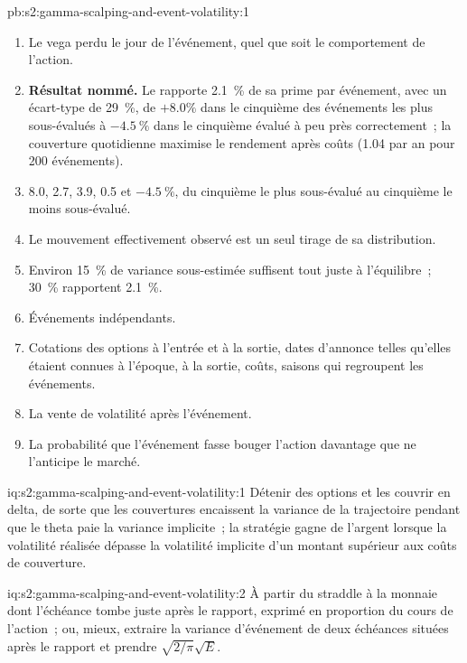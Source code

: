 \begin{solution}{pb:s2:gamma-scalping-and-event-volatility:1}
\begin{enumerate}
\item Le vega perdu le jour de l'événement, quel que soit le comportement de l'action.
\item \textbf{Résultat nommé.} Le  rapporte 2.1~\% de sa prime par événement, avec un écart-type de 29~\%, de $+8.0\%$ dans le cinquième des
événements les plus sous-évalués à $-4.5~\%$ dans le cinquième évalué à peu près correctement~; la couverture quotidienne maximise le rendement après coûts (1.04 par an pour 200 événements).
\item 8.0, 2.7, 3.9, 0.5 et $-4.5~\%$, du cinquième le plus sous-évalué au cinquième le moins sous-évalué.
\item Le mouvement effectivement observé est un seul tirage de sa distribution.
\item Environ 15~\% de variance sous-estimée suffisent tout juste à l'équilibre~; 30~\% rapportent 2.1~\%.
\item Événements indépendants.
\item Cotations des options à l'entrée et à la sortie, dates d'annonce telles qu'elles étaient connues à l'époque,  à la sortie, coûts, saisons qui regroupent les événements.
\item La vente de volatilité après l'événement.
\item La probabilité que l'événement fasse bouger l'action davantage que ne l'anticipe le marché.
\end{enumerate}
\end{solution}

\begin{solution}{iq:s2:gamma-scalping-and-event-volatility:1}
Détenir des options et les couvrir en delta, de sorte que les couvertures encaissent la variance de la trajectoire pendant que le theta paie la variance implicite~; la stratégie gagne de l'argent lorsque
la volatilité réalisée dépasse la volatilité implicite d'un montant supérieur aux coûts de couverture.
\end{solution}

\begin{solution}{iq:s2:gamma-scalping-and-event-volatility:2}
À partir du straddle à la monnaie dont l'échéance tombe juste après le rapport, exprimé en proportion du cours de l'action~; ou, mieux, extraire la variance d'événement
de deux échéances situées après le rapport et prendre $\sqrt{2/\pi}\sqrt{E}$.
\end{solution}

